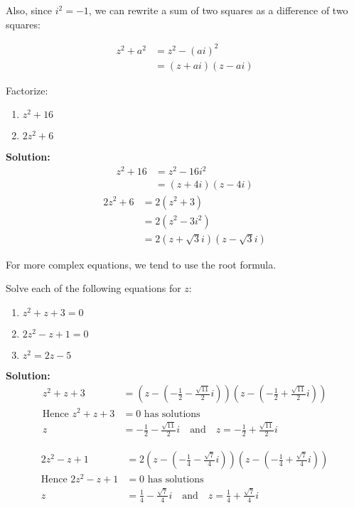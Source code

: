 Also, since $i^2 = -1$, we can rewrite a sum of two squares as a difference of two squares:
\begin{corollary}
    $$\begin{aligned}
        z^{2}+a^{2}& =z^2-(ai)^2  \\
        &=(z+ai)(z-ai)
        \end{aligned}$$
\end{corollary}
\begin{example}
    Factorize:
    \begin{enumerate}
        \item $z^2+16$
        \item $2z^2+6$
    \end{enumerate}
\end{example}
\textbf{Solution:}
$$ \begin{aligned}
        z^2 + 16 &= z^2 - 16i^2 \\
                 &= (z + 4i)(z - 4i)
    \end{aligned}$$
$$\begin{aligned}
        2z^2 + 6 &= 2(z^2 + 3) \\
                 &= 2(z^2 - 3i^2) \\
                 &= 2(z + \sqrt{3}i)(z - \sqrt{3}i)
    \end{aligned}$$

For more complex equations, we tend to use the root formula.
\begin{example}
    Solve each of the following equations for \( z \):
    \begin{enumerate}
        \item \( z^2 + z + 3 = 0 \)
        \item \( 2z^2 - z + 1 = 0 \)
        \item \( z^2 = 2z - 5 \)
    \end{enumerate}
\end{example}
\textbf{Solution:}
$$\begin{aligned}
    z^2 + z + 3 &= \left(z - \left(-\frac{1}{2} - \frac{\sqrt{11}}{2}i\right)\right)\left(z - \left(-\frac{1}{2} + \frac{\sqrt{11}}{2}i\right)\right) \\
    \text{Hence } z^2 + z + 3 &= 0 \text{ has solutions} \\
    z &= -\frac{1}{2} - \frac{\sqrt{11}}{2}i \quad \text{and} \quad z = -\frac{1}{2} + \frac{\sqrt{11}}{2}i
\end{aligned}$$

$$\begin{aligned}
    2z^2 - z + 1 &= 2\left(z - \left(-\frac{1}{4} - \frac{\sqrt{7}}{4}i\right)\right)\left(z - \left(-\frac{1}{4} + \frac{\sqrt{7}}{4}i\right)\right) \\
    \text{Hence } 2z^2 - z + 1 &= 0 \text{ has solutions} \\
    z &= \frac{1}{4} - \frac{\sqrt{7}}{4}i \quad \text{and} \quad z = \frac{1}{4} + \frac{\sqrt{7}}{4}i
\end{aligned}$$

